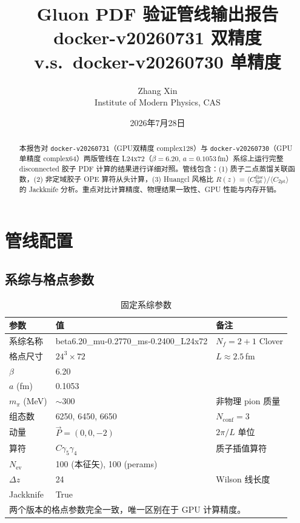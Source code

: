 \documentclass[12pt,a4paper]{ctexart}
\title{\textbf{Gluon PDF 验证管线输出报告} \\[4pt]
       \large docker-v20260731 双精度 v.s.\ docker-v20260730 单精度}
\author{Zhang Xin \\ Institute of Modern Physics, CAS}
\date{2026年7月28日}
\begin{document}
\maketitle

\begin{abstract}
本报告对 \texttt{docker-v20260731}（GPU双精度 complex128）与 \texttt{docker-v20260730}（GPU单精度 complex64）两版管线在 L24x72（$\beta=6.20$, $a=0.1053$\,fm）系综上运行完整 disconnected 胶子 PDF 计算的结果进行详细对照。管线包含：(1) 质子二点蒸馏关联函数，(2) 非定域胶子 OPE 算符从头计算，(3) Huangcl 风格比 $R(z)=\langle C_{\text{3pt}}^{\text{disc}}\rangle/\langle C_{\text{2pt}}\rangle$ 的 Jackknife 分析。重点对比计算精度、物理结果一致性、GPU 性能与内存开销。
\end{abstract}

\tableofcontents
\newpage

\section{管线配置}

\subsection{系综与格点参数}

\begin{table}[H]
\centering
\caption{固定系综参数}
\begin{tabular}{lll}
\toprule
参数 & 值 & 备注 \\
\midrule
系综名称 & beta6.20\_mu-0.2770\_ms-0.2400\_L24x72 & $N_f=2+1$ Clover \\
格点尺寸 & $24^3\times 72$ & $L\approx 2.5$\,fm \\
$\beta$ & 6.20 & \\
$a$ (fm) & 0.1053 & \\
$m_\pi$ (MeV) & $\sim 300$ & 非物理 pion 质量 \\
组态数& 6250, 6450, 6650 & $N_{\text{conf}}=3$ \\
动量 & $\vec{P}=(0,0,-2)$ & $2\pi/L$ 单位 \\
算符 & $C\gamma_5\gamma_4$ & 质子插值算符 \\
$N_{\text{ev}}$ & 100 (本征矢), 100 (perams) & \\
$\Delta z$ & 24 & Wilson 线长度 \\
Jackknife & True & \\
\midrule
\multicolumn{3}{l}{\small 两个版本的格点参数完全一致，唯一区别在于 GPU 计算精度。} \\
\bottomrule
\end{tabular}
\end{table}
\end{document}
